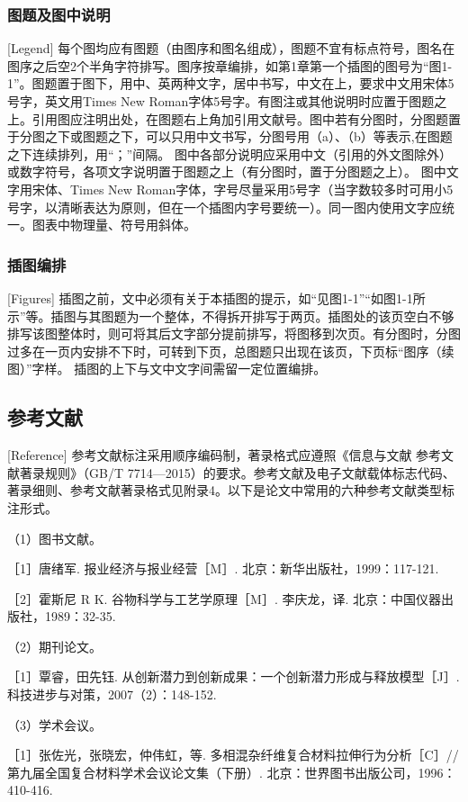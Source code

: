 \subsubsection{图题及图中说明}[Legend]
每个图均应有图题（由图序和图名组成），图题不宜有标点符号，图名在图序之后空2个半角字符排写。图序按章编排，如第1章第一个插图的图号为“图1-1”。图题置于图下，用中、英两种文字，居中书写，中文在上，要求中文用宋体5号字，英文用Times New Roman字体5号字。有图注或其他说明时应置于图题之上。引用图应注明出处，在图题右上角加引用文献号。图中若有分图时，分图题置于分图之下或图题之下，可以只用中文书写，分图号用（a）、（b）等表示,在图题之下连续排列，用“；”间隔。
图中各部分说明应采用中文（引用的外文图除外）或数字符号，各项文字说明置于图题之上（有分图时，置于分图题之上）。
图中文字用宋体、Times New Roman字体，字号尽量采用5号字（当字数较多时可用小5号字，以清晰表达为原则，但在一个插图内字号要统一）。同一图内使用文字应统一。图表中物理量、符号用斜体。

\subsubsection{插图编排}[Figures]
插图之前，文中必须有关于本插图的提示，如“见图1-1”“如图1-1所示”等。插图与其图题为一个整体，不得拆开排写于两页。插图处的该页空白不够排写该图整体时，则可将其后文字部分提前排写，将图移到次页。有分图时，分图过多在一页内安排不下时，可转到下页，总图题只出现在该页，下页标“图序（续图）”字样。
插图的上下与文中文字间需留一定位置编排。

\subsection{参考文献}[Reference]
参考文献标注采用顺序编码制，著录格式应遵照《信息与文献  参考文献著录规则》（GB/T 7714—2015）的要求。参考文献及电子文献载体标志代码、著录细则、参考文献著录格式见附录4。以下是论文中常用的六种参考文献类型标注形式。

（1）图书文献。

［1］唐绪军. 报业经济与报业经营［M］. 北京：新华出版社，1999：117-121.

［2］霍斯尼 R K. 谷物科学与工艺学原理［M］. 李庆龙，译. 北京：中国仪器出版社，1989：32-35.

（2）期刊论文。

［1］覃睿，田先钰. 从创新潜力到创新成果：一个创新潜力形成与释放模型［J］. 科技进步与对策，2007（2）：148-152.

（3）学术会议。

［1］张佐光，张晓宏，仲伟虹，等. 多相混杂纤维复合材料拉伸行为分析［C］//第九届全国复合材料学术会议论文集（下册）. 北京：世界图书出版公司，1996：410-416.

